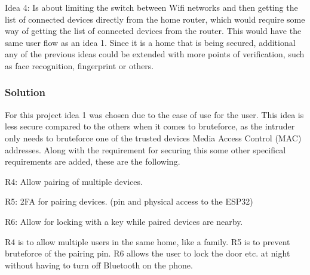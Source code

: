 Idea 4: Is about limiting the switch between Wifi networks and then getting the list of connected devices directly from the home router, which would require some way of getting the list of connected devices from the router.
This would have the same user flow as an idea 1.
Since it is a home that is being secured, additional any of the previous ideas could be extended with more points of verification, such as face recognition, fingerprint or others.

\subsubsection{Solution}
For this project idea 1 was chosen due to the ease of use for the user.
This idea is less secure compared to the others when it comes to bruteforce, as the intruder only needs to bruteforce one of the trusted devices Media Access Control (MAC) addresses.
Along with the requirement for securing this some other specifical requirements are added, these are the following.
\newline

R4: Allow pairing of multiple devices.

R5: 2FA for pairing devices. (pin and physical access to the ESP32)

R6: Allow for locking with a key while paired devices are nearby.
\newline

R4 is to allow multiple users in the same home, like a family.
R5 is to prevent bruteforce of the pairing pin.
R6 allows the user to lock the door etc. at night without having to turn off Bluetooth on the phone.
